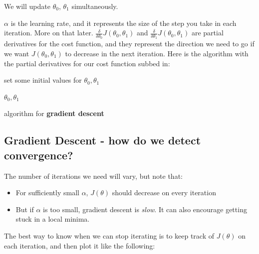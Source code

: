 \documentclass[11pt]{article}
\begin{document}
    We will update  $\theta_0$, $\theta_1$ simultaneously.

    $\alpha$ is the learning rate, and it represents the size of the step you take in each iteration. More on that later.  $\frac{\delta}{\delta \theta_0} J(\theta_0, \theta_1) $ and $\frac{\delta}{\delta \theta_1} J(\theta_0, \theta_1) $ are partial derivatives for the cost function, and they represent the direction we need to go if we want $J(\theta_0, \theta_1)$ to decrease in the next iteration. Here is the algorithm with the partial derivatives for our cost function subbed in:
    
    
    \begin{algorithm}
    \SetAlgoLined
     set some initial values for $\theta_0, \theta_1$ \\
    

    \Return $\theta_0, \theta_1$

    \caption{algorithm for \textbf{gradient descent}}
\end{algorithm} 
    
    \subsection{Gradient Descent - how do we detect convergence?}

    The number of iterations we need will vary, but note that:
    \begin{itemize}
        \item For sufficiently small $\alpha$, $J(\theta)$ should decrease on every iteration
        \item But if $\alpha$ is too small, gradient descent is \textit{slow}. It can also encourage getting stuck in a local minima.
    \end{itemize}

    The best way to know when we can stop iterating is to keep track of $J(\theta)$ on each iteration, and then plot it like the following:
    
\end{document}
